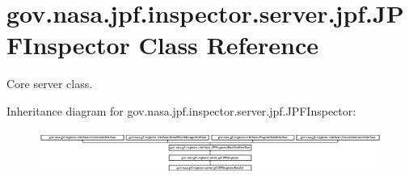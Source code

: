 \hypertarget{classgov_1_1nasa_1_1jpf_1_1inspector_1_1server_1_1jpf_1_1_j_p_f_inspector}{}\section{gov.\+nasa.\+jpf.\+inspector.\+server.\+jpf.\+J\+P\+F\+Inspector Class Reference}
\label{classgov_1_1nasa_1_1jpf_1_1inspector_1_1server_1_1jpf_1_1_j_p_f_inspector}


Core server class.  


Inheritance diagram for gov.\+nasa.\+jpf.\+inspector.\+server.\+jpf.\+J\+P\+F\+Inspector\+:\begin{figure}[H]
\begin{center}
\leavevmode
\includegraphics[height=1.454545cm]{classgov_1_1nasa_1_1jpf_1_1inspector_1_1server_1_1jpf_1_1_j_p_f_inspector}
\end{center}
\end{figure}
